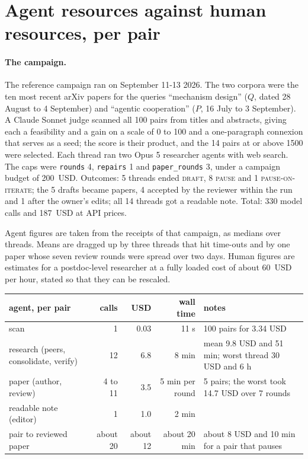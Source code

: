 \documentclass[11pt,a4paper]{article}
\newcommand{\file}[1]{\texttt{#1}}
\begin{document}
\appendix
\section{Agent resources against human resources, per pair}
\label{app:resources}

\paragraph{The campaign.} The reference campaign ran on September 11-13 2026.
The two corpora were the ten most recent arXiv papers for the queries
``mechanism design'' ($Q$, dated 28 August to 4 September) and ``agentic
cooperation'' ($P$, 16 July to 3 September). A Claude Sonnet judge scanned all
100 pairs from titles and abstracts, giving each a feasibility and a gain on a
scale of 0 to 100 and a one-paragraph connexion that serves as a seed; the score
is their product, and the 14 pairs at or above 1500 were selected. Each thread
ran two Opus 5 researcher agents with web search. The caps were \file{rounds} 4,
\file{repairs} 1 and \file{paper\_rounds} 3, under a campaign budget of 200~USD.
Outcomes: 5 threads ended \textsc{draft}, 8 \textsc{pause} and 1
\textsc{pause-on-iterate}; the 5 drafts became papers, 4 accepted by the
reviewer within the run and 1 after the owner's edits; all 14 threads got a
readable note. Total: 330 model calls and 187~USD at API prices.

Agent figures are taken from the receipts of that campaign, as medians
over threads. Means are dragged up by three threads that hit time-outs and
by one paper whose seven review rounds were spread over two days. Human
figures are estimates for a postdoc-level researcher at a fully loaded cost
of about 60~USD per hour, stated so that they can be rescaled.

\begin{center}
\small
\begin{tabularx}{\textwidth}{@{}lrrrX@{}}
\toprule
agent, per pair & calls & USD & wall time & notes \\
\midrule
scan & 1 & 0.03 & 11 s & 100 pairs for 3.34 USD \\
research (peers, consolidate, verify) & 12 & 6.8 & 8 min & mean 9.8 USD and 51 min; worst thread 30 USD and 6 h \\
paper (author, review) & 4 to 11 & 3.5 & 5 min per round & 5 pairs; the worst took 14.7 USD over 7 rounds \\
readable note (editor) & 1 & 1.0 & 2 min & \\
\midrule
pair to reviewed paper & about 20 & about 12 & about 20 min & about 8 USD and 10 min for a pair that pauses \\
\bottomrule
\end{tabularx}
\end{center}
\end{document}
